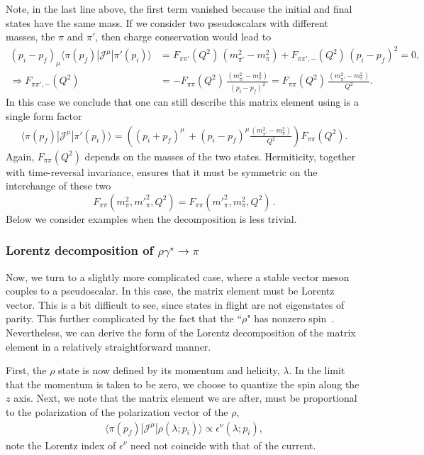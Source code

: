 Note, in the last line above, the first term vanished because the initial and final states have the same mass. If we consider two pseudoscalars with different masses, the $\pi$ and $\pi'$, then charge conservation would lead to
\begin{align}
(p_i-p_f)_\mu\langle\pi(p_f)|{\mathcal{J}}^{\mu}|\pi'(p_i)\rangle&=
F_{\pi\pi'}(Q^2)\, (m_{\pi'}^2-m_\pi^2)
+
F_{\pi\pi',-}(Q^2)\,(p_i-p_f)^2
=0,
\\
\Rightarrow
F_{\pi\pi',-}(Q^2)
&=-
F_{\pi\pi}(Q^2)\, \frac{(m_{\pi'}^2-m_\pi^2)}{(p_i-p_f)^2}
= 
F_{\pi\pi}(Q^2)\, \frac{(m_{\pi'}^2-m_\pi^2)}{Q^2}.
\end{align} 
In this case we conclude that one can still describe this matrix element using is a single form factor
\begin{align}
\langle\pi(p_f)|{\mathcal{J}}^{\mu}|\pi'(p_i)\rangle=
\left( (p_i+p_f)^\mu \, +(p_i-p_f)^\mu\frac{(m_{\pi'}^2-m_\pi^2)}{Q^2}\right)F_{\pi\pi}(Q^2).
\label{eq:pi_to_pi_FF}
\end{align}
Again, $F_{\pi\pi}(Q^2)$ depends on the masses of the two states. {\mh  Hermiticity, together with time-reversal invariance, ensures that it must be symmetric on the interchange of these two
\begin{equation}
F_{\pi\pi}(m^2_\pi, m'^2 _\pi,Q^2) = F_{\pi\pi}(m'^2_\pi, m^2 _\pi,Q^2) \,.
\end{equation}}
Below we consider examples when the decomposition is less trivial.  



\subsubsection{Lorentz decomposition of $\rho\gamma^\star\to\pi$}

Now, we turn to a slightly more complicated case, where a stable vector meson couples to a pseudoscalar.  In this case, the matrix element must be Lorentz vector. This is a bit difficult to see, since states in flight are not eigenstates of parity. This further complicated by the fact that the ``$\rho$" has nonzero spin~\cite{Thomas:2011rh}. Nevertheless, we can derive the form of the Lorentz decomposition of the matrix element in a relatively straightforward manner.

First, the $\rho$ state is now defined by its momentum and helicity, $\lambda$. In the limit that the momentum is taken to be zero, we choose to quantize the spin along the $z$ axis.  Next, we note that the matrix element we are after, must be proportional to the polarization of the polarization vector of the $\rho$,
\begin{align}
\langle \pi(p_f)|\mathcal{J}^\mu|\rho(\lambda; p_i)\rangle\propto \epsilon^\nu(\lambda; p_i),
\end{align}
note the Lorentz index of $\epsilon^\nu$ need not coincide with that of the current. 

